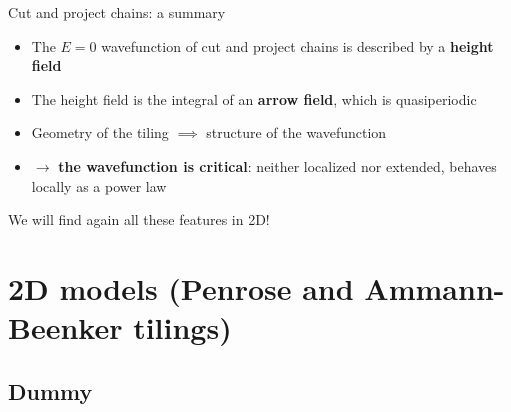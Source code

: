 \documentclass[xcolor=x11names,compress,professionalfonts, aspectratio=169]{beamer}
\renewcommand{\(}{\begin{columns}}
\renewcommand{\)}{\end{columns}}
\newcommand{\<}[1]{\begin{column}{#1}}
\renewcommand{\>}{\end{column}}
\begin{document}
\begin{frame}{Cut and project chains: a summary}
\begin{itemize}
	\item The $E=0$ wavefunction of cut and project chains is described by a \textbf{height field}
	\item The height field is the integral of an \textbf{arrow field}, which is quasiperiodic
	\item Geometry of the tiling $\implies$ structure of the wavefunction
	\item $\rightarrow$ \textbf{the wavefunction is critical}: neither localized nor extended, behaves locally as a power law
\end{itemize}
We will find again all these features in 2D!
\end{frame}

\section{2D models (Penrose and Ammann-Beenker tilings)}
\subsection{Dummy}
\end{document}

